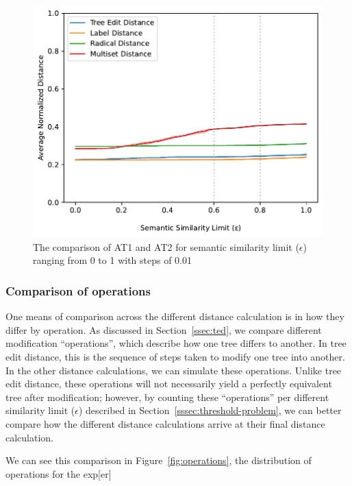 \begin{figure}
    \includegraphics[width=\linewidth]{code/img/similaritylimits_at1-2_percentage.pdf}
    \caption{The comparison of AT1 and AT2 for semantic similarity limit ($\epsilon$) ranging from 0 to 1 with steps of 0.01}
    \label{fig:semsim-at1-2}
\end{figure}




\subsubsection{Comparison of operations}

One means of comparison across the different distance calculation is in how they differ by operation. As discussed in Section~\ref{ssec:ted}, we compare different modification ``operations'', which describe how one tree differs to another. In tree edit distance, this is the sequence of steps taken to modify one tree into another. In the other distance calculations, we can simulate these operations. Unlike tree edit distance, these operations will not necessarily yield a perfectly equivalent tree after modification; however, by counting these ``operations'' per different similarity limit ($\epsilon$) described in Section~\ref{sssec:threshold-problem}, we can better compare how the different distance calculations arrive at their final distance calculation.

We can see this comparison in Figure~\ref{fig:operations}, the distribution of operations for the exp[er]

